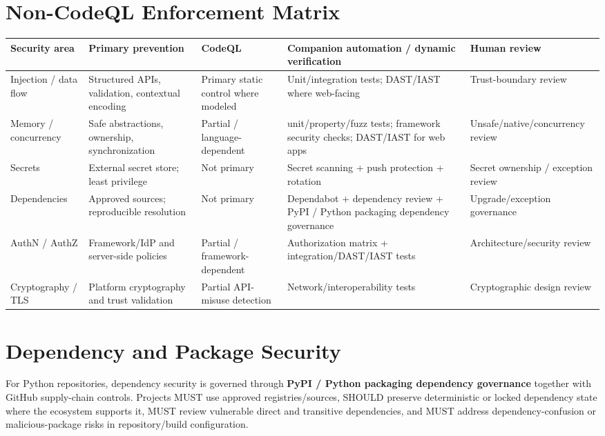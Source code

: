 \documentclass[10pt,letterpaper]{article}
\begin{document}
\section{Non-CodeQL Enforcement Matrix}
\begin{tabularx}{\textwidth}{@{}P{1.22in}Y P{1.55in} P{1.55in} P{1.5in}@{}}
\toprule
\textbf{Security area} & \textbf{Primary prevention} & \textbf{CodeQL} & \textbf{Companion automation / dynamic verification} & \textbf{Human review}\\
\midrule
Injection / data flow & Structured APIs, validation, contextual encoding & Primary static control where modeled & Unit/integration tests; DAST/IAST where web-facing & Trust-boundary review\\
Memory / concurrency & Safe abstractions, ownership, synchronization & Partial / language-dependent & unit/property/fuzz tests; framework security checks; DAST/IAST for web apps & Unsafe/native/concurrency review\\
Secrets & External secret store; least privilege & Not primary & Secret scanning + push protection + rotation & Secret ownership / exception review\\
Dependencies & Approved sources; reproducible resolution & Not primary & Dependabot + dependency review + PyPI / Python packaging dependency governance & Upgrade/exception governance\\
AuthN / AuthZ & Framework/IdP and server-side policies & Partial / framework-dependent & Authorization matrix + integration/DAST/IAST tests & Architecture/security review\\
Cryptography / TLS & Platform cryptography and trust validation & Partial API-misuse detection & Network/interoperability tests & Cryptographic design review\\
\bottomrule
\end{tabularx}

\section{Dependency and Package Security}
For Python repositories, dependency security is governed through \textbf{PyPI / Python packaging dependency governance} together with GitHub supply-chain controls. Projects MUST use approved registries/sources, SHOULD preserve deterministic or locked dependency state where the ecosystem supports it, MUST review vulnerable direct and transitive dependencies, and MUST address dependency-confusion or malicious-package risks in repository/build configuration.
\end{document}

